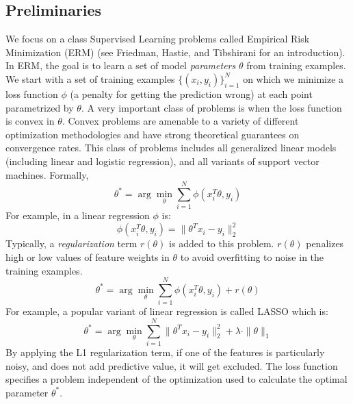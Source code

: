 \subsection{Preliminaries}

We focus on a class Supervised Learning problems called Empirical Risk Minimization (ERM) (see Friedman, Hastie, and Tibshirani \cite{friedman2001elements} for an introduction).
In ERM, the goal is to learn a set of model \emph{parameters} $\theta$ from training examples.
We start with a set of training examples $\{(x_{i},y_{i})\}_{i=1}^{N}$
on which we minimize a loss function $\phi$ (a penalty for getting the prediction wrong) at each point parametrized by $\theta$.
A very important class of problems is when the loss function is convex in $\theta$.
Convex problems are amenable to a variety of different optimization methodologies
and have strong theoretical guarantees on convergence rates.
This class of problems includes all generalized linear models (including linear and logistic regression), and all variants of support vector machines.
Formally,
\[
 \theta^{*}=\arg\min_{\theta}\sum_{i=1}^{N}\phi(x_{i}^T\theta,y_{i})
\]
For example, in a linear regression $\phi$ is:
\[
\phi(x_{i}^T\theta,y_{i}) = \|\theta^Tx_{i} - y_i \|_2^2
\]
Typically, a \emph{regularization} term $r(\theta)$ is added to this problem.
$r(\theta)$ penalizes high or low values of feature weights in $\theta$ to avoid overfitting to noise in the training examples.
\[
 \theta^{*}=\arg\min_{\theta}\sum_{i=1}^{N}\phi(x_{i}^T\theta,y_{i}) + r(\theta)
\]
For example, a popular variant of linear regression is called LASSO which is:
\[
 \theta^{*}=\arg\min_{\theta}\sum_{i=1}^{N}\|\theta^Tx_{i} - y_i \|_2^2 + \lambda \cdot \|\theta\|_1
\]
By applying the L1 regularization term, if one of the features is particularly noisy, and does not add predictive value, it will get excluded.
The loss function specifies a problem independent of the optimization used to calculate the optimal parameter $\theta^{*}$.

